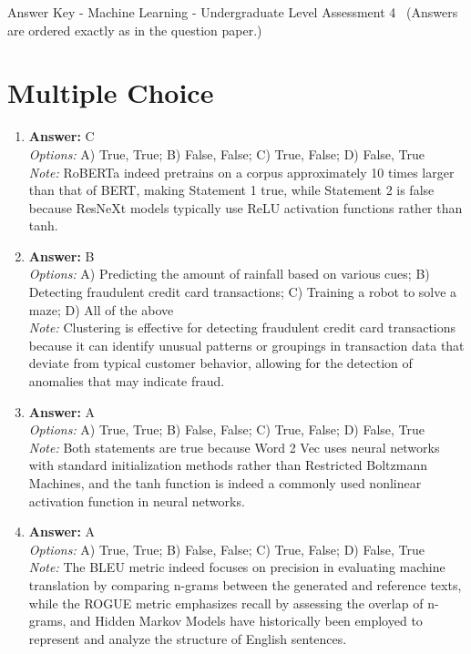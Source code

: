 \documentclass[12pt]{article}
\begin{document}
\begin{center}
Answer Key - Machine Learning - Undergraduate Level Assessment 4 \
\small (Answers are ordered exactly as in the question paper.)
\end{center}

\section*{Multiple Choice}
\begin{enumerate}[label=\arabic*.]
\item \textbf{Answer:} C
\\ \textit{Options:} A) True, True; B) False, False; C) True, False; D) False, True
\\ \textit{Note:} RoBERTa indeed pretrains on a corpus approximately 10 times larger than that of BERT, making Statement 1 true, while Statement 2 is false because ResNeXt models typically use ReLU activation functions rather than tanh.
\item \textbf{Answer:} B
\\ \textit{Options:} A) Predicting the amount of rainfall based on various cues; B) Detecting fraudulent credit card transactions; C) Training a robot to solve a maze; D) All of the above
\\ \textit{Note:} Clustering is effective for detecting fraudulent credit card transactions because it can identify unusual patterns or groupings in transaction data that deviate from typical customer behavior, allowing for the detection of anomalies that may indicate fraud.
\item \textbf{Answer:} A
\\ \textit{Options:} A) True, True; B) False, False; C) True, False; D) False, True
\\ \textit{Note:} Both statements are true because Word 2 Vec uses neural networks with standard initialization methods rather than Restricted Boltzmann Machines, and the tanh function is indeed a commonly used nonlinear activation function in neural networks.
\item \textbf{Answer:} A
\\ \textit{Options:} A) True, True; B) False, False; C) True, False; D) False, True
\\ \textit{Note:} The BLEU metric indeed focuses on precision in evaluating machine translation by comparing n-grams between the generated and reference texts, while the ROGUE metric emphasizes recall by assessing the overlap of n-grams, and Hidden Markov Models have historically been employed to represent and analyze the structure of English sentences.

\end{enumerate}
\end{document}
